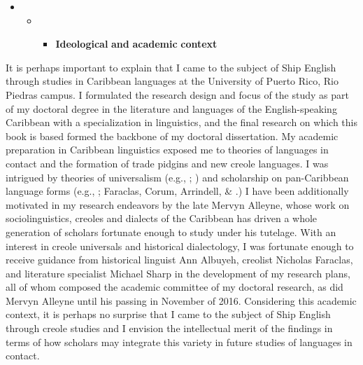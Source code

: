 \begin{itemize}
\item 
\begin{itemize}
\item 
\begin{itemize}
\item \textbf{Ideological} \textbf{and} \textbf{academic} \textbf{context}
\end{itemize}
\end{itemize}
\end{itemize}

It is perhaps important to explain that I came to the subject of Ship English through studies in Caribbean languages at the University of Puerto Rico, Rio Piedras campus. I formulated the research design and focus of the study as part of my doctoral degree in the literature and languages of the English-speaking Caribbean with a specialization in linguistics, and the final research on which this book is based formed the backbone of my doctoral dissertation. My academic preparation in Caribbean linguistics exposed me to theories of languages in contact and the formation of trade pidgins and new creole languages. I was intrigued by theories of universalism (e.g., \citealt{MuyskenSmith1986}; \citealt{McWhorter2011}) and scholarship on pan-Caribbean language forms (e.g., \citealt{Allsopp2003}; Faraclas, Corum, Arrindell, \& \citealt{Ourdy2012}.) I have been additionally motivated in my research endeavors by the late Mervyn Alleyne, whose work on sociolinguistics, creoles and dialects of the Caribbean has driven a whole generation of scholars fortunate enough to study under his tutelage. With an interest in creole universals and historical dialectology, I was fortunate enough to receive guidance from historical linguist Ann Albuyeh, creolist Nicholas Faraclas, and literature specialist Michael Sharp in the development of my research plans, all of whom composed the academic committee of my doctoral research, as did Mervyn Alleyne until his passing in November of 2016. Considering this academic context, it is perhaps no surprise that I came to the subject of Ship English through creole studies and I envision the intellectual merit of the findings in terms of how scholars may integrate this variety in future studies of languages in contact.



